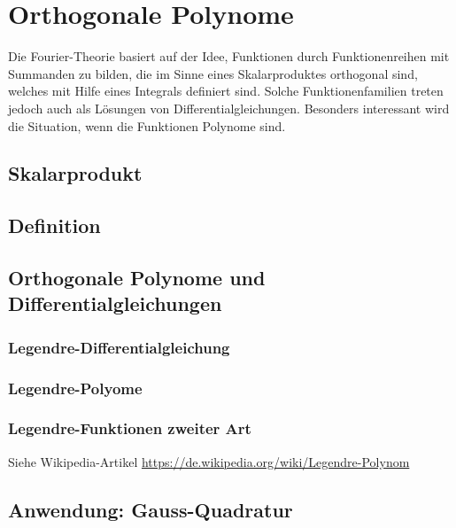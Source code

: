 %
%
%
\section{Orthogonale Polynome
\label{buch:integral:section:orthogonale-polynome}}
Die Fourier-Theorie basiert auf der Idee, Funktionen durch 
Funktionenreihen mit Summanden zu bilden, die im Sinne eines
Skalarproduktes orthogonal sind, welches mit Hilfe eines Integrals
definiert sind.
Solche Funktionenfamilien treten jedoch auch als Lösungen von
Differentialgleichungen.
Besonders interessant wird die Situation, wenn die Funktionen 
Polynome sind.

\subsection{Skalarprodukt}
\subsection{Definition}
\subsection{Orthogonale Polynome und Differentialgleichungen}
\subsubsection{Legendre-Differentialgleichung}
\subsubsection{Legendre-Polyome}
\subsubsection{Legendre-Funktionen zweiter Art}
Siehe Wikipedia-Artikel \url{https://de.wikipedia.org/wiki/Legendre-Polynom}
\subsection{Anwendung: Gauss-Quadratur}

